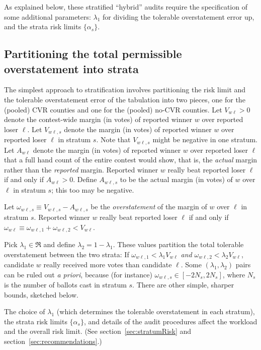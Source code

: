 \documentclass[12pt]{article}
\begin{document}
As explained below, these stratified ``hybrid'' audits require the specification of some additional parameters:
$\lambda_1$ for dividing the tolerable overstatement error up, and the strata risk limits $\{\alpha_s\}$.

\subsection{Partitioning the total permissible overstatement into strata}
The simplest approach to stratification involves partitioning the risk limit and the tolerable
overstatement error of the tabulation into
two pieces, one for the (pooled) CVR counties and one for the (pooled) no-CVR counties.
Let $V_{w\ell} > 0$ denote the contest-wide margin (in votes) of reported winner 
$w$ over reported loser
$\ell$.
Let $V_{w\ell,s}$ denote the margin (in votes) of reported winner $w$ over reported loser $\ell$
in stratum $s$. 
Note that $V_{w\ell,s}$ might be negative in one stratum.
Let $A_{w\ell}$ denote the margin (in votes)
of reported winner $w$ over reported loser $\ell$ that 
a full hand count of the entire contest would show, that is, the \emph{actual} margin rather
than the \emph{reported} margin.
Reported winner $w$ really beat reported loser $\ell$ if and only if $A_{w\ell} > 0$.
Define $A_{w\ell,s}$ to be the actual margin (in votes) of $w$ over $\ell$ in stratum $s$;
this too may be negative.

Let $\omega_{w\ell,s} \equiv V_{w\ell,s} - A_{w\ell,s}$ be the \emph{overstatement}
of the margin of $w$ over $\ell$ in stratum $s$.
Reported winner $w$ really beat reported loser 
$\ell$ if and only if $\omega_{w\ell} \equiv \omega_{w\ell,1} + \omega_{w\ell,2} < V_{w\ell}$.

Pick $\lambda_1 \in \Re$ and define $\lambda_2 = 1-\lambda_1$. These values partition the
total tolerable overstatement between the two strata:
If $\omega_{w\ell,1} < \lambda_1 V_{w\ell}$ \emph{and} 
$\omega_{w\ell,2} < \lambda_2 V_{w\ell}$, candidate $w$ really received more votes
than candidate $\ell$.
Some $(\lambda_1, \lambda_2)$ pairs 
can be ruled out \emph{a priori}, because (for instance) $\omega_{w\ell,s} \in [-2N_s, 2N_s]$,
where $N_s$ is the number of ballots cast in stratum $s$.
There are other simple, sharper bounds, sketched below.

The choice of $\lambda_1$ (which determines the tolerable overstatement in each
stratum), the strata risk limits $\{\alpha_s\}$, and details of the
audit procedures affect the workload and the overall risk limit.
(See section~\ref{sec:stratumRisk} and section~\ref{sec:recommendations}.)
\end{document}
